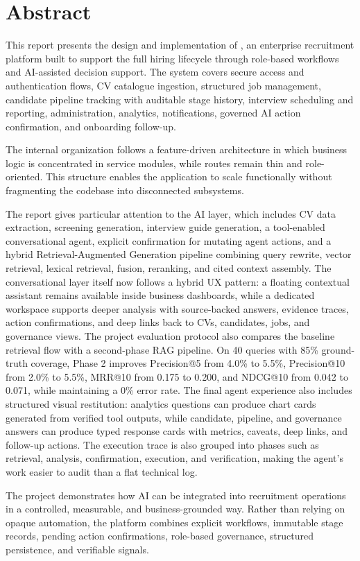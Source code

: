 \chapter*{Abstract}

This report presents the design and implementation of \projectname{}, an enterprise recruitment platform built to support the full hiring lifecycle through role-based workflows and AI-assisted decision support. The system covers secure access and authentication flows, CV catalogue ingestion, structured job management, candidate pipeline tracking with auditable stage history, interview scheduling and reporting, administration, analytics, notifications, governed AI action confirmation, and onboarding follow-up.

The internal organization follows a feature-driven architecture in which business logic is concentrated in service modules, while routes remain thin and role-oriented. This structure enables the application to scale functionally without fragmenting the codebase into disconnected subsystems.

The report gives particular attention to the AI layer, which includes CV data extraction, screening generation, interview guide generation, a tool-enabled conversational agent, explicit confirmation for mutating agent actions, and a hybrid Retrieval-Augmented Generation pipeline combining query rewrite, vector retrieval, lexical retrieval, fusion, reranking, and cited context assembly. The conversational layer itself now follows a hybrid UX pattern: a floating contextual assistant remains available inside business dashboards, while a dedicated  workspace supports deeper analysis with source-backed answers, evidence traces, action confirmations, and deep links back to CVs, candidates, jobs, and governance views. The project evaluation protocol also compares the baseline retrieval flow with a second-phase RAG pipeline. On 40 queries with 85\% ground-truth coverage, Phase 2 improves Precision@5 from 4.0\% to 5.5\%, Precision@10 from 2.0\% to 5.5\%, MRR@10 from 0.175 to 0.200, and NDCG@10 from 0.042 to 0.071, while maintaining a 0\% error rate.
The final agent experience also includes structured visual restitution: analytics questions can produce chart cards generated from verified tool outputs, while candidate, pipeline, and governance answers can produce typed response cards with metrics, caveats, deep links, and follow-up actions. The execution trace is also grouped into phases such as retrieval, analysis, confirmation, execution, and verification, making the agent's work easier to audit than a flat technical log.

The project demonstrates how AI can be integrated into recruitment operations in a controlled, measurable, and business-grounded way. Rather than relying on opaque automation, the platform combines explicit workflows, immutable stage records, pending action confirmations, role-based governance, structured persistence, and verifiable signals.

